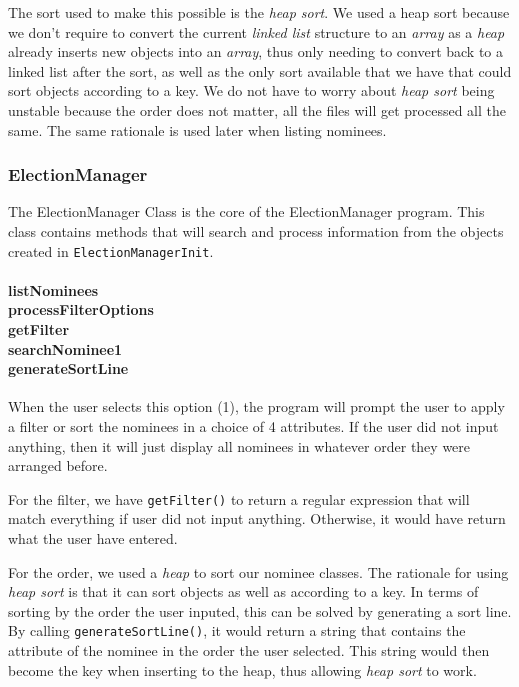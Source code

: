 \documentclass[a4paper, 12pt, titlepage]{article}
\newcommand{\code}[1]{\small\texttt{#1}\normalsize}
\begin{document}
The sort used to make this possible is the \textit{heap sort}. We used a heap
sort because we don't require to convert the current \textit{linked list}
structure to an \textit{array} as a \textit{heap} already inserts new objects
into an \textit{array}, thus only needing to convert back to a linked list
after the sort, as well as the only sort available that we have that could
sort objects according to a key. We do not have to worry about
\textit{heap sort} being unstable because the order does not matter, all the
files will get processed all the same. The same rationale is used later when
listing nominees.

\newpage

\subsubsection{ElectionManager}

The ElectionManager Class is the core of the ElectionManager program. This
class contains methods that will search and process information from the
objects created in \code{ElectionManagerInit}.

\paragraph{listNominees \\
           processFilterOptions \\
           getFilter \\
           searchNominee1 \\
           generateSortLine
} \hspace{0pt}

When the user selects this option (1), the program will prompt the user
to apply a filter or sort the nominees in a choice of 4 attributes. If the
user did not input anything, then it will just display all nominees in
whatever order they were arranged before.

For the filter, we have \code{getFilter()} to return a regular expression that
will match everything if user did not input anything. Otherwise, it would have
return what the user have entered.

For the order, we used a \textit{heap} to sort our nominee classes. The
rationale for using \textit{heap sort} is that it can sort objects as well
as according to a key. In terms of sorting by the order the user inputed, this
can be solved by generating a sort line. By calling \code{generateSortLine()},
it would return a string that contains the attribute of the nominee in the
order the user selected. This string would then become the key when inserting
to the heap, thus allowing \textit{heap sort} to work.
\end{document}
